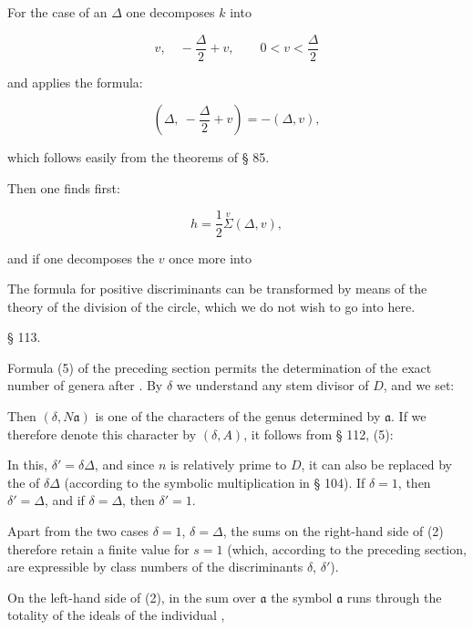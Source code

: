 For the case of an  $\Delta$ one decomposes $k$ into

\[
v, \quad -\frac{\Delta}{2} + v, \qquad 0 < v < \frac{\Delta}{2}
\]

and applies the formula:

\[
\left(\Delta,\ -\frac{\Delta}{2} + v\right) = -(\Delta,v),
\]

which follows easily from the theorems of § 85.

Then one finds first:

\[
h = \frac{1}{2}\overset{v}{\Sigma}(\Delta,v),
\]

and if one decomposes the $v$ once more into


The formula for positive discriminants can be transformed by means
of the theory of the division of the circle, which we do not wish to go
into here.

\begin{center}
§ 113.\quad {}
\end{center}

Formula (5) of the preceding section permits the determination
 of the exact number of genera after .
By $\delta$ we understand any stem divisor of $D$, and we set:


Then $(\delta,N\mathfrak{a})$ is one of the characters of the genus determined
by $\mathfrak{a}$. If we therefore denote this character by $(\delta,A)$,
it follows from § 112, (5):


In this, $\delta' = \delta\Delta$, and since $n$ is relatively prime to $D$, it can
also be replaced by the  of $\delta\Delta$ (according to the symbolic
 multiplication in § 104). If $\delta = 1$, then $\delta' = \Delta$,
and if $\delta = \Delta$, then $\delta' = 1$.

Apart from the two cases $\delta = 1$, $\delta = \Delta$, the sums on the
right-hand side of (2) therefore retain a finite value for $s = 1$
(which, according to the preceding section, are expressible by class numbers
 of the discriminants $\delta$, $\delta'$).

On the left-hand side of (2), in the sum over $\mathfrak{a}$
the symbol $\mathfrak{a}$ runs through the totality of the ideals of the individual ,
